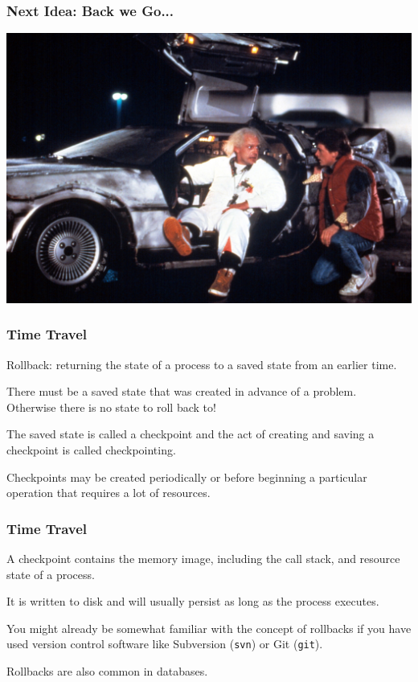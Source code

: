 \begin{frame}
\frametitle{Next Idea: Back we Go...}

\begin{center}
	\includegraphics[width=\textwidth]{images/bttf.jpg}
\end{center}

\end{frame}


\begin{frame}
\frametitle{Time Travel}

\alert{Rollback}: returning the state of a process to a saved state from an earlier time. 

There must be a saved state that was created in advance of a problem. \\
\quad Otherwise there is no state to roll back to!

The saved state is called a \alert{checkpoint} and the act of creating and saving a checkpoint is called \alert{checkpointing}.

Checkpoints may be created periodically or before beginning a particular operation that requires a lot of resources.

\end{frame}

\begin{frame}
\frametitle{Time Travel}

A checkpoint contains the memory image, including the call stack, and resource state of a process. 

It is written to disk and will usually persist as long as the process executes. 

You might already be somewhat familiar with the concept of rollbacks if you have used version control software like Subversion (\texttt{svn}) or Git (\texttt{git}).

Rollbacks are also common in databases.

\end{frame}


